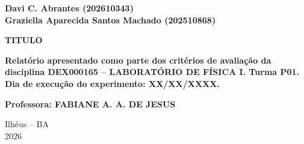 \begin{center}

{\large\textbf{Davi C. Abrantes (202610343)}}\\[0.3cm]
{\large\textbf{Graziella Aparecida Santos Machado (202510868)}}

\vspace{7cm}

{\large\textbf{TITULO}}

\end{center}

\vspace{6.5cm}

\begin{flushright}
\begin{minipage}{0.60\textwidth}
\setlength{\parindent}{0pt}

\textbf{Relatório apresentado como parte dos critérios de avaliação da disciplina
DEX000165 -- LABORATÓRIO DE FÍSICA I. Turma P01. Dia de execução do experimento: XX/XX/XXXX.}

\vspace{0.8cm}

\textbf{Professora: FABIANE A. A. DE JESUS}

\end{minipage}
\end{flushright}

\vfill

\begin{center}
Ilhéus -- BA\\
2026
\end{center}